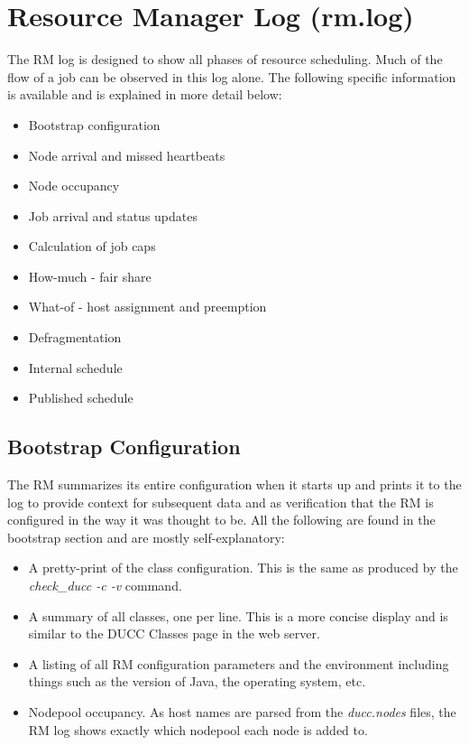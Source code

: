 \section{Resource Manager Log (rm.log)}

    The RM log is designed to show all phases of resource scheduling.  Much of the flow of a job can
    be observed in this log alone.  The following specific information is available and is explained in
    more detail below:
    \begin{itemize}
      \item Bootstrap configuration
      \item Node arrival and missed heartbeats
      \item Node occupancy
      \item Job arrival and status updates
      \item Calculation of job caps
      \item How-much - fair share 
      \item What-of - host assignment and preemption
      \item Defragmentation
      \item Internal schedule
      \item Published schedule
    \end{itemize}
    
\subsection{Bootstrap Configuration}
   The RM summarizes its entire configuration when it starts up and prints it to the log to
   provide context for subsequent data and as verification that the RM is configured in the
   way it was thought to be.  All the following are found in the bootstrap section and are mostly
   self-explanatory:

   \begin{itemize}
     \item A pretty-print of the class configuration.  This is the same as produced by the {\em check\_ducc -c -v} 
       command.
     \item A summary of all classes, one per line.  This is a more concise display and is similar to the
       DUCC Classes page in the web server.
     \item A listing of all RM configuration parameters and the environment including things such as the
       version of Java, the operating system, etc.
     \item Nodepool occupancy.  As host names are parsed from the {\em ducc.nodes} files, the RM log
       shows exactly which nodepool each node is added to.
   \end{itemize}
   
